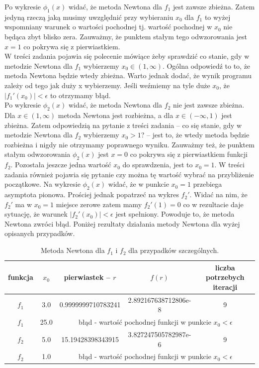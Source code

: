 \documentclass[]{article}
\begin{document}
	Po wykresie $\phi_1(x)$ widać, że metoda Newtona dla $f_1$ jest zawsze zbieżna. Zatem jedyną rzeczą jaką musimy uwzględnić przy wybieraniu $x_0$ dla $f_1$ to wyżej wspomniany warunek o wartości pochodnej tj. wartość pochodnej w $x_0$ nie będąca zbyt blisko zera. Zauważmy, że punktem stałym tego odwzorowania jest $x=1$ co pokrywa się z pierwiastkiem.\\
	W treści zadania pojawia się polecenie mówiące żeby sprawdzić co stanie, gdy w metodzie Newtona dla $f_1$ wybierzemy $x_0\in(1,\infty)$. Ogólna odpowiedź to to, że metoda Newtona będzie wtedy zbieżna. Warto jednak dodać, że wynik programu zależy od tego jak duży x wybierzemy. Jeśli weźmiemy na tyle duże $x_0$, że $|f_1'(x_0)|<\epsilon$ to otrzymamy błąd.\\
	Po wykresie $\phi_2(x)$ widać, że metoda Newtona dla $f_2$ nie jest zawsze zbieżna. Dla $x\in(1,\infty)$ metoda Newtona jest rozbieżna, a dla $x\in(-\infty, 1)$ jest zbieżna. Zatem odpowiedzią na pytanie z treści zadania -- co się stanie, gdy w metodzie Newtona dla $f_2$ wybierzemy $x_0>1$? -- jest to, że wtedy metoda będzie rozbieżna i nigdy nie otrzymamy poprawnego wyniku. Zauważmy też, że punktem stałym odwzorowania $\phi_2(x)$ jest $x=0$ co pokrywa się z pierwiastkiem funkcji $f_2$. Pozostała jeszcze jedna wartość $x_0$ do sprawdzenia, jest to $x_0=1$. W treści zadania również pojawia się pytanie czy można tę wartość wybrać na przybliżenie początkowe.
	Na wykresie $\phi_2(x)$ widać, że w punkcie $x_0 = 1$ przebiega asymptota pionowa. Prościej jednak popatrzeć na wykres $f_2'$. Widać na nim, że $f_2'$ ma w $x_0=1$ miejsce zerowe zatem mamy $f_2'(1) =0$ co w rezultacie daje sytuację, że warunek $|f_2'(x_0)|<\epsilon$ jest spełniony. Powoduje to, że metoda Newtona zwróci błąd. Poniżej rezultaty działania metody Newtona dla wyżej opisanych przypadków.
	\begin{table}[!h]
		\centering
		\label{tab:table1}
		\begin{tabular}{|c|c|c|c|c|}
			\hline
			funkcja & $x_0$ & pierwiastek -- $r$ & $f(r)$ & liczba potrzebych iteracji\\
			\hline
			$f_1$ & 3.0 & 0.9999999710783241 & 2.892167638712806e-8 & 9\\ \hline
			$f_1$ & 25.0 & \multicolumn{3}{|c|}{błąd - wartość pochodnej funkcji w punkcie $x_0<\epsilon$ } \\ \hline
			$f_2$ & 5.0 & 15.19428398343915 & 3.827247505782987e-6 & 9\\  \hline
			$f_2$ & 1.0 & \multicolumn{3}{|c|}{błąd - wartość pochodnej funkcji w punkcie $x_0<\epsilon$ } \\ \hline
		\end{tabular}
		\caption*{Metoda Newtona dla $f_1$ i $f_2$ dla przypadków szczególnych.}
	\end{table}
	
\end{document}
